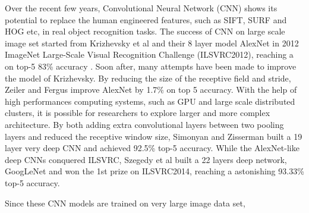 ﻿Over the recent few years, Convolutional Neural Network (CNN) shows its potential to replace the human engineered features, such as SIFT\cite{lowe1999object}, SURF\cite{bay2006surf} and HOG\cite{dalal2005histograms} etc, in real object recognition tasks.  The success of CNN on large scale image set started from Krizhevsky et al\cite{krizhevsky2012imagenet} and their 8 layer model AlexNet in 2012 ImageNet Large-Scale Visual Recognition Challenge (ILSVRC2012), reaching a on top-5 83\% accuracy . Soon after, many attempts have been made to improve the model of Krizhevsky. 
By reducing the size of the receptive field and stride, Zeiler and Fergus improve AlexNet by 1.7\% on top 5 accuracy\cite{zeiler2014visualizing}. With the help of high performances computing systems, such as GPU and large scale distributed clusters, it is possible for researchers to explore larger and more complex architecture. By both adding extra convolutional layers between two pooling layers and reduced the receptive window size, Simonyan and Zisserman built a 19 layer very deep CNN and achieved 92.5\% top-5 accuracy\cite{simonyan2014very}. While the AlexNet-like deep CNNs conquered ILSVRC, Szegedy et al built a 22 layers deep network, GoogLeNet \cite{szegedy2014going} and won the 1st prize on ILSVRC2014, reaching a astonishing 93.33\% top-5 accuracy.

Since these CNN models are trained on very large image data set, 
 
   
